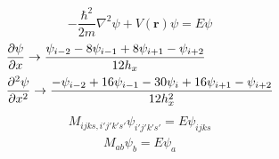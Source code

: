 \documentclass{article}
\begin{document}
\begin{equation}
    -\frac{\hbar ^ 2}{2m}\nabla ^ 2 \psi + V(\mathbf r) \psi = E \psi
\end{equation}
\begin{align}
    &\pdv{\psi}{x}\rightarrow \frac{\psi_{i-2} - 8\psi_{i-1} + 8\psi_{i+1} - \psi_{i+2}}{12h_x}
    \\&\pdv[2]{\psi }{x}\rightarrow \frac{-\psi_{i-2} + 16\psi_{i-1} -30 \psi_{i} + 16\psi_{i+1} - \psi_{i+2}}{12h_x^2}
\end{align}
\begin{align}
    M_{i j k s, i' j' k' s'} \psi_{i'j'k's'} = E\psi_{ijks}
\end{align}
\begin{align}
    M_{ab}\psi_b = E\psi_a
\end{align}
\end{document}
